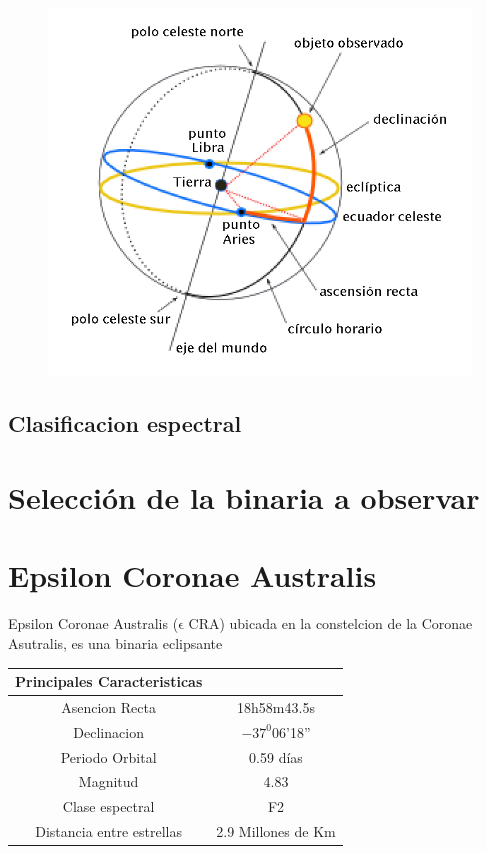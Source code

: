 \documentclass[Proceedings]{ascelike}
\begin{document}
\begin{figure}
\includegraphics[scale=0.4]{Coordenadas_ecuatoriales.png}
\end{figure}

\subsection{Clasificacion espectral}

\section{Selecci\'on de la binaria a observar}

\section{Epsilon Coronae Australis}

Epsilon Coronae Australis ($\mathrm{\epsilon}$ CRA) ubicada en la 
constelcion de la Coronae Asutralis, es una binaria eclipsante \\

\begin{tabular}{c c}
\hline
Principales Caracteristicas\\
\hline
\hline
Asencion Recta & 18h58m43.5s \\
Declinacion & $-37^{0}$06'18'' \\
Periodo Orbital & 0.59 d\'ias \\
Magnitud & 4.83 \\
Clase espectral & F2 \\
Distancia entre estrellas & 2.9 Millones de Km\\ 
\hline
\hline
\end{tabular}
\end{document}
